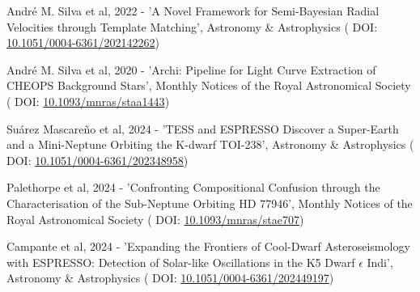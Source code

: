 \n


\vspace*{0.2cm}

  André M. Silva et al, 2022 - 'A Novel Framework for Semi-{{Bayesian}} Radial Velocities through Template Matching', Astronomy \& Astrophysics (\textcolor{MarkerColour!80!black}{\scriptsize\faLink} DOI: \href{http://dx.doi.org/10.1051/0004-6361/202142262}{10.1051/0004-6361/202142262})

\vspace*{0.3cm}

  André M. Silva et al, 2020 - 'Archi: Pipeline for Light Curve Extraction of {{CHEOPS}} Background Stars', Monthly Notices of the Royal Astronomical Society (\textcolor{MarkerColour!80!black}{\scriptsize\faLink} DOI: \href{http://dx.doi.org/10.1093/mnras/staa1443}{10.1093/mnras/staa1443})

\vspace*{0.3cm}

\vspace*{0.2cm}


\vspace*{0.2cm}

  Su{\'a}rez Mascare{\~n}o et al, 2024 - '{{TESS}} and {{ESPRESSO}} Discover a Super-{{Earth}} and a Mini-{{Neptune}} Orbiting the {{K-dwarf TOI-238}}', Astronomy \& Astrophysics ( \textcolor{MarkerColour!80!black}{\scriptsize\faLink} DOI: \href{http://dx.doi.org/10.1051/0004-6361/202348958}{10.1051/0004-6361/202348958})

\vspace*{0.3cm}

  Palethorpe et al, 2024 - 'Confronting Compositional Confusion through the Characterisation of the Sub-{{Neptune}} Orbiting {{HD}} 77946', Monthly Notices of the Royal Astronomical Society ( \textcolor{MarkerColour!80!black}{\scriptsize\faLink} DOI: \href{http://dx.doi.org/10.1093/mnras/stae707}{10.1093/mnras/stae707})

\vspace*{0.3cm}

  Campante et al, 2024 - 'Expanding the Frontiers of Cool-Dwarf Asteroseismology with {{ESPRESSO}}: {{Detection}} of Solar-like Oscillations in the {{K5}} Dwarf {\emph{{$\epsilon$}}} {{Indi}}', Astronomy \& Astrophysics ( \textcolor{MarkerColour!80!black}{\scriptsize\faLink} DOI: \href{http://dx.doi.org/10.1051/0004-6361/202449197}{10.1051/0004-6361/202449197})

